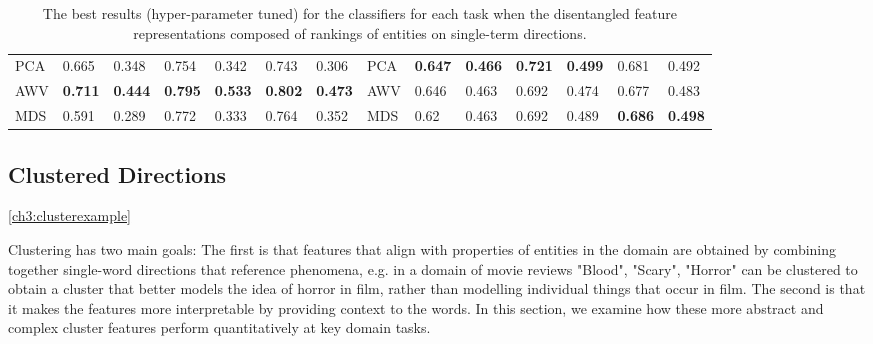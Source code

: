 {\begin{landscape}
\begin{table}[]
\begin{tabular}{llllllllllllll}
PCA        & 0.665                           & 0.348                           & 0.754                           & 0.342                           & 0.743                           & 0.306                           & PCA                             & \textbf{0.647} & \textbf{0.466} & \textbf{0.721} & \textbf{0.499} & 0.681                           & 0.492                           \\
AWV        & \textbf{0.711} & \textbf{0.444} & \textbf{0.795} & \textbf{0.533} & \textbf{0.802} & \textbf{0.473} & AWV                             & 0.646                           & 0.463                           & 0.692                           & 0.474                           & 0.677                           & 0.483                           \\
MDS        & 0.591                           & 0.289                           & 0.772                           & 0.333                           & 0.764                           & 0.352                           & MDS                             & 0.62                            & 0.463                           & 0.692                           & 0.489                           & \textbf{0.686} & \textbf{0.498}
	\end{tabular}\label{ch3:singledirs}
	\caption{The best results (hyper-parameter tuned) for the classifiers for each task when the disentangled feature representations composed of rankings of entities on single-term directions.}
\end{table}
\end{landscape}
}

\subsection{Clustered Directions}
\ref{ch3:clusterexample}

Clustering has two main goals: The first is that features that  align with properties of entities in the domain are obtained by combining together single-word directions that reference phenomena, e.g. in a domain of movie reviews "Blood", "Scary",  "Horror" can be clustered to obtain a cluster that better models the idea of horror in film, rather than modelling individual things that occur in film. The second is that it makes the features more interpretable by providing context to the words. In this section, we examine how these more abstract and complex cluster features perform quantitatively at key domain tasks.

